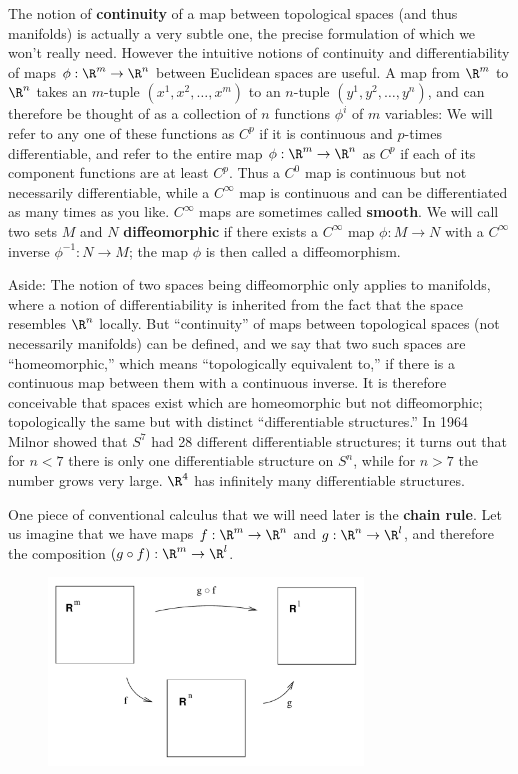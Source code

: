 \documentclass[12pt]{article}
\begin{document}
The notion of {\bf continuity} of a map between topological spaces (and 
thus manifolds) is actually a very subtle one, the precise formulation of
which we won't really
need.  However the intuitive notions of continuity and differentiability
of maps $\phi:\R^m\rightarrow\R^n$ between Euclidean spaces are useful.
A map from $\R^m$ to $\R^n$ takes an $m$-tuple $(x^1,x^2,\ldots,x^m)$
to an $n$-tuple $(y^1,y^2,\ldots,y^n)$, and can therefore
be thought of as a collection of $n$ functions $\phi^i$ of $m$ variables:
\be
  \label{2.1}
\ee
We will refer to any one of these functions as $C^p$ if it is continuous 
and $p$-times differentiable, and refer to the entire map 
$\phi:\R^m\rightarrow\R^n$ as $C^p$ if each of its component functions
are at least $C^p$.  Thus a $C^0$ map is continuous but not 
necessarily differentiable,
while a $C^\infty$ map is continuous and can be differentiated as many
times as you like.  $C^\infty$ maps are sometimes called {\bf smooth}.
We will call two sets $M$ and $N$ {\bf diffeomorphic} if there exists
a $C^\infty$ map $\phi:M\rightarrow N$ with a $C^\infty$ inverse 
$\phi^{-1}:N\rightarrow M$; the map $\phi$ is then called a diffeomorphism.

Aside: The notion of two spaces being diffeomorphic only applies to
manifolds, where a notion of differentiability is inherited from the
fact that the space resembles $\R^n$ locally.  But ``continuity'' of maps
between topological spaces (not necessarily manifolds) can be defined,
and we say that two such spaces are ``homeomorphic,'' which means 
``topologically equivalent to,'' if there is a continuous map 
between them with a continuous inverse.  It is therefore conceivable that
spaces exist which are homeomorphic but not diffeomorphic; topologically
the same but with distinct ``differentiable structures.''  In 1964 Milnor 
showed that $S^7$ had 28 different differentiable structures; 
it turns out that for $n<7$ there is only one differentiable 
structure on $S^n$, while for $n>7$ the number grows very large.  
$\R^4$ has infinitely many differentiable structures.

One piece of conventional calculus that we will need later is the
{\bf chain rule}.  Let us imagine that we have maps $f:\R^m\rightarrow
\R^n$ and $g:\R^n\rightarrow \R^l$, and therefore the composition
$(g\circ f):\R^m\rightarrow\R^l$.  

\begin{figure}[h]
  \centerline{
  \includegraphics[height=5cm]{pdf/two8}}
\end{figure}
\end{document}
